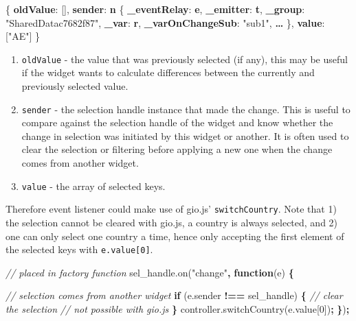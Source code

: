 \documentclass[
]{krantz}
\makeatletter
\newenvironment{Shaded}{\begin{snugshade}}{\end{snugshade}}
\newcommand{\AttributeTok}[1]{\textcolor[rgb]{0.61,0.61,0.61}{#1}}
\newcommand{\CommentTok}[1]{\textcolor[rgb]{0.37,0.37,0.37}{\textit{#1}}}
\newcommand{\ControlFlowTok}[1]{\textcolor[rgb]{0.27,0.27,0.27}{\textbf{#1}}}
\newcommand{\DecValTok}[1]{\textcolor[rgb]{0.06,0.06,0.06}{#1}}
\newcommand{\ErrorTok}[1]{\textcolor[rgb]{0.14,0.14,0.14}{\textbf{#1}}}
\newcommand{\FunctionTok}[1]{\textcolor[rgb]{0,0,0}{#1}}
\newcommand{\KeywordTok}[1]{\textcolor[rgb]{0.27,0.27,0.27}{\textbf{#1}}}
\newcommand{\NormalTok}[1]{#1}
\newcommand{\OperatorTok}[1]{\textcolor[rgb]{0.43,0.43,0.43}{\textbf{#1}}}
\newcommand{\OtherTok}[1]{\textcolor[rgb]{0.37,0.37,0.37}{#1}}
\newcommand{\StringTok}[1]{\textcolor[rgb]{0.5,0.5,0.5}{#1}}
\newcommand{\VariableTok}[1]{\textcolor[rgb]{0,0,0}{#1}}
\providecommand{\tightlist}{%
  \setlength{\itemsep}{0pt}\setlength{\parskip}{0pt}}
\newenvironment{kframe}{%
\medskip{}
\setlength{\fboxsep}{.8em}
 \def\at@end@of@kframe{}%
 \ifinner\ifhmode%
  \def\at@end@of@kframe{\end{minipage}}%
  \begin{minipage}{\columnwidth}%
 \fi\fi%
 \def\FrameCommand##1{\hskip\@totalleftmargin \hskip-\fboxsep
 \colorbox{shadecolor}{##1}\hskip-\fboxsep
     \hskip-\linewidth \hskip-\@totalleftmargin \hskip\columnwidth}%
 \MakeFramed {\advance\hsize-\width
   \@totalleftmargin\z@ \linewidth\hsize
   \@setminipage}}%
 {\par\unskip\endMakeFramed%
 \at@end@of@kframe}
\renewenvironment{Shaded}{\begin{kframe}}{\end{kframe}}
\makeatother
\begin{document}
\begin{Shaded}
\begin{Highlighting}[]
\FunctionTok{\{}
  \ErrorTok{oldValue}\FunctionTok{:} \OtherTok{[]}\FunctionTok{,}
  \ErrorTok{sender}\FunctionTok{:} \ErrorTok{n} \FunctionTok{\{}
    \ErrorTok{\_eventRelay}\FunctionTok{:} \ErrorTok{e}\FunctionTok{,} 
    \ErrorTok{\_emitter}\FunctionTok{:} \ErrorTok{t}\FunctionTok{,} 
    \ErrorTok{\_group}\FunctionTok{:} \StringTok{"SharedDatac7682f87"}\FunctionTok{,} 
    \ErrorTok{\_var}\FunctionTok{:} \ErrorTok{r}\FunctionTok{,} 
    \ErrorTok{\_varOnChangeSub}\FunctionTok{:} \StringTok{"sub1"}\FunctionTok{,} 
    \ErrorTok{…}
  \FunctionTok{\},}
  \ErrorTok{value}\FunctionTok{:} \OtherTok{[}\StringTok{"AE"}\OtherTok{]}
\FunctionTok{\}}
\end{Highlighting}
\end{Shaded}

\begin{enumerate}
\def\labelenumi{\arabic{enumi}.}
\tightlist
\item
  \texttt{oldValue} - the value that was previously selected (if any), this may be useful if the widget wants to calculate differences between the currently and previously selected value.
\item
  \texttt{sender} - the selection handle instance that made the change. This is useful to compare against the selection handle of the widget and know whether the change in selection was initiated by this widget or another. It is often used to clear the selection or filtering before applying a new one when the change comes from another widget.
\item
  \texttt{value} - the array of selected keys.
\end{enumerate}

Therefore event listener could make use of gio.js' \texttt{switchCountry}. Note that 1) the selection cannot be cleared with gio.js, a country is always selected, and 2) one can only select one country a time, hence only accepting the first element of the selected keys with \texttt{e.value{[}0{]}}.

\begin{Shaded}
\begin{Highlighting}[]
\CommentTok{// placed in factory function}
\VariableTok{sel\_handle}\NormalTok{.}\AttributeTok{on}\NormalTok{(}\StringTok{"change"}\OperatorTok{,} \KeywordTok{function}\NormalTok{(e) }\OperatorTok{\{}

  \CommentTok{// selection comes from another widget}
  \ControlFlowTok{if}\NormalTok{ (}\VariableTok{e}\NormalTok{.}\AttributeTok{sender} \OperatorTok{!==}\NormalTok{ sel\_handle) }\OperatorTok{\{}
    \CommentTok{// clear the selection}
    \CommentTok{// not possible with gio.js}
  \OperatorTok{\}}
  \VariableTok{controller}\NormalTok{.}\AttributeTok{switchCountry}\NormalTok{(}\VariableTok{e}\NormalTok{.}\AttributeTok{value}\NormalTok{[}\DecValTok{0}\NormalTok{])}\OperatorTok{;}
\OperatorTok{\}}\NormalTok{)}\OperatorTok{;}
\end{Highlighting}
\end{Shaded}
\end{document}
